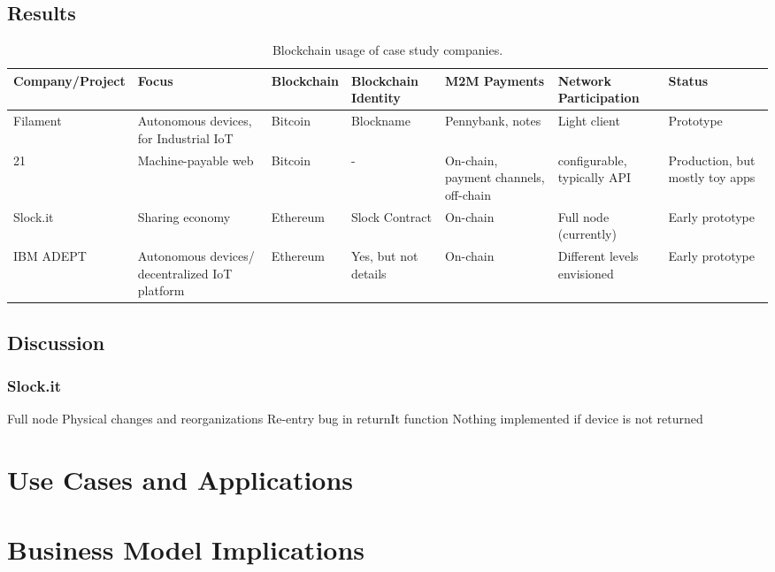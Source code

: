 \subsection{Results}

\begin{table}
\centering
\label{my-label}
\begin{tabular}[\tiny]{@{}lp{1.5 cm}lp{1.5 cm}p{1.5 cm}p{1.5 cm}p{1.5 cm}@{}}
\toprule
Company/Project & Focus                                          & Blockchain & Blockchain Identity  & M2M Payments     & Network Participation       & Status                          \\ \midrule
Filament        & Autonomous devices, for Industrial IoT          & Bitcoin    & Blockname            & Pennybank, notes              & Light client                & Prototype                       \\
21              & Machine-payable web                            & Bitcoin    & -                    & On-chain, payment channels, off-chain              & configurable, typically API & Production, but mostly toy apps \\
Slock.it        & Sharing economy                                & Ethereum   & Slock Contract       & On-chain & Full node (currently)       & Early prototype                 \\
IBM ADEPT       & Autonomous devices/ decentralized IoT platform & Ethereum   & Yes, but not details & On-chain              & Different levels envisioned & Early prototype                 \\ \bottomrule
\end{tabular}
\caption{Blockchain usage of case study companies.}
\end{table}

\subsection{Discussion}

\subsubsection{Slock.it}


Full node
Physical changes and reorganizations
Re-entry bug in returnIt function
Nothing implemented if device is not returned


\section{Use Cases and Applications}

\section{Business Model Implications}




